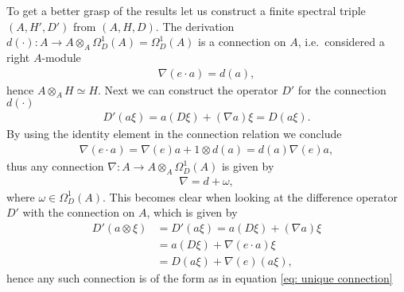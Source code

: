 To get a better grasp of the results let us construct a finite spectral
triple $(A, H', D')$ from $(A, H, D)$. The derivation $d(\cdot):A \rightarrow
A\otimes _A \Omega_D^1(A)=\Omega_D^1(A)$ is a connection on $A$, i.e.\ considered a
right $A$-module
\begin{align}
        \nabla(e \cdot a) =  d(a),
\end{align}
hence $A\otimes_A H\simeq H$. Next we can construct the operator $D'$
for the connection $d(\cdot)$
\begin{align}
    D'(a\xi) = a(D\xi) + (\nabla a) \xi = D(a\xi).
\end{align}
By using the identity element in the connection relation we conclude
\begin{align}
   \nabla (e\cdot a) = \nabla(e) a + 1 \otimes d(a)=d(a) \nabla(e) a,
\end{align}
thus any connection $\nabla: A\rightarrow A\otimes_A \Omega_D^1(A)$ is
given by
\begin{align}\label{eq: uniqueconnection}
    \nabla = d + \omega,
\end{align}
where $\omega \in \Omega_D^1(A)$. This becomes clear when looking at the
difference operator $D'$ with the connection on $A$, which is given by
\begin{align}
    D'(a\otimes \xi) &= D'(a \xi) = a(D\xi) + (\nabla a)\xi \nonumber \\
                     &=a(D\xi) + \nabla(e \cdot a) \xi \nonumber\\
                     &= D(a\xi) + \nabla(e) (a\xi),
\end{align}
hence any such connection is of the form as in equation \eqref{eq: unique
connection}

